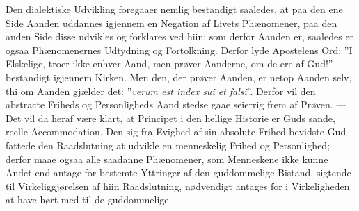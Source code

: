 \documentclass[12pt]{book}
\newcommand{\opage}[1]{\marginnote{\footnotesize\textit{[#1]}}}
\begin{document}
Den dialektiske Udvikling foregaaer nemlig bestandigt saaledes, at paa den ene
Side Aanden uddannes igjennem en Negation af Livets Phænomener, paa den anden
Side disse udvikles og forklares ved hiin; som derfor Aanden er, saaledes er
ogsaa Phænomenernes Udtydning og Fortolkning. Derfor lyde Apostelens Ord: ”I
Elskelige, troer ikke enhver Aand, men prøver Aanderne, om de ere af Gud!”
bestandigt igjennem Kirken. Men den, der prøver Aanden, er netop Aanden selv, thi
om Aanden gjælder det: ”\textit{verum est index sui et falsi}”. Derfor vil den
abstracte Friheds og Personligheds Aand stedse gaae seierrig frem af Prøven. ---
Det vil da heraf være klart, at Principet i den hellige Historie er Guds sande,
reelle Accommodation. Den sig fra Evighed
\opage{157} %
af sin absolute Frihed bevidste Gud fattede den Raadslutning at udvikle en
menneskelig Frihed og Personlighed; derfor maae ogsaa alle saadanne Phænomener,
som Menneskene ikke kunne Andet end antage for bestemte Yttringer af den
guddommelige Bistand, sigtende til Virkeliggjørelsen af hiin Raadslutning,
nødvendigt antages for i Virkeligheden at have hørt med til de guddommelige
\end{document}
